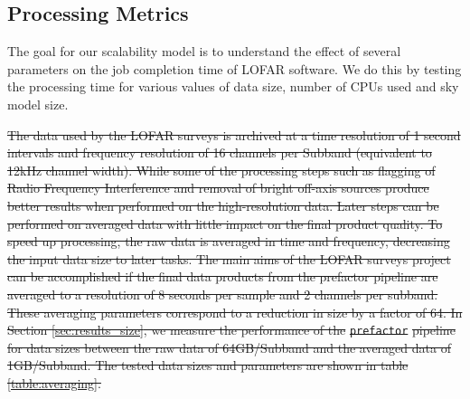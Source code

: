 \documentclass[preprint,5p]{elsarticle}
\providecommand{\DIFdel}[1]{{\protect\color{red}\sout{#1}}}                      %
\providecommand{\DIFdelbegin}{} %
\newcommand{\DIFscaledelfig}{0.5}
\newlength{\DIFdelgraphicswidth} %
\newlength{\DIFdelgraphicsheight} %
\newcommand{\DIFdelincludegraphics}[2][]{%
\sbox{\DIFdelgraphicsbox}{\DIFOincludegraphics[#1]{#2}}%
\settoboxwidth{\DIFdelgraphicswidth}{\DIFdelgraphicsbox} %
\settoboxtotalheight{\DIFdelgraphicsheight}{\DIFdelgraphicsbox} %
\scalebox{\DIFscaledelfig}{%
\parbox[b]{\DIFdelgraphicswidth}{\usebox{\DIFdelgraphicsbox}\\[-\baselineskip] \rule{\DIFdelgraphicswidth}{0em}}\llap{\resizebox{\DIFdelgraphicswidth}{\DIFdelgraphicsheight}{%
\setlength{\unitlength}{\DIFdelgraphicswidth}%
\begin{picture}(1,1)%
\thicklines\linethickness{2pt} %
{\color[rgb]{1,0,0}\put(0,0){\framebox(1,1){}}}%
{\color[rgb]{1,0,0}\put(0,0){\line( 1,1){1}}}%
{\color[rgb]{1,0,0}\put(0,1){\line(1,-1){1}}}%
\end{picture}%
}\hspace*{3pt}}} %
} %
\DeclareRobustCommand{\DIFdelbegin}{\DIFOdelbegin \let\includegraphics\DIFdelincludegraphics} %
\begin{document}
\subsection{Processing Metrics}
The goal for our scalability model is to understand the effect of several parameters on the job completion time of LOFAR software. We do this by testing the processing time for various values of data size, number of CPUs used and sky model size. 


\DIFdelbegin \DIFdel{The data used by the LOFAR surveys is archived at a time resolution of 1 second intervals and frequency resolution of 16 channels per Subband (equivalent to 12kHz channel width). While some of the processing steps such as flagging of Radio Frequency Interference and removal of bright off-axis sources produce better results when performed on the high-resolution data. Later steps can be performed on averaged data with little impact on the final product quality. To speed up processing, the raw data is averaged in time and frequency, decreasing the input data size to later tasks. The main aims of the LOFAR surveys project can be accomplished if the final data products from the prefactor pipeline are averaged to a resolution of 8 seconds per sample and 2 channels per subband. These averaging parameters correspond to a reduction in size by a factor of 64. In Section \ref{sec:results_size}, we measure the performance of the }\texttt{\DIFdel{prefactor}} %
\DIFdel{pipeline for data sizes between the raw data of 64GB/Subband and the averaged data of 1GB/Subband. The tested data sizes and parameters are shown in table \ref{table:averaging}. 
}%
\end{document}
